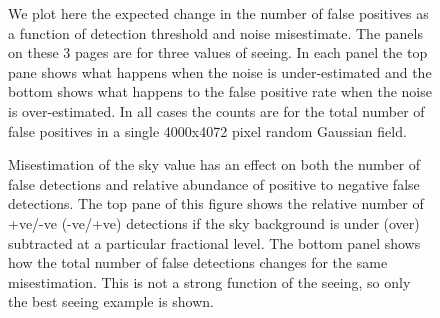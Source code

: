 \documentclass[prd, nofootinbib, floatfix, 11pt,tightenlines,times]{article}
\begin{document}
\begin{figure}
  \centering 
  \caption[]{ We plot here the expected change in the number of false positives
    as a function of detection threshold and noise misestimate.  The
    panels on these 3 pages are for three values of seeing.  In each panel the
    top pane shows what happens when the noise is under-estimated and
    the bottom shows what happens to the false positive rate when the
    noise is over-estimated.  In all cases the counts are for the
    total number of false positives in a single 4000x4072 pixel random
    Gaussian field.
    }
  \label{fig-fpthresh}
\end{figure}
\clearpage
\begin{figure}
  \ContinuedFloat 
  \centering 
  \caption[]{}
\end{figure} 
\clearpage
\begin{figure}
  \ContinuedFloat 
  \centering 
  \caption[]{}
\end{figure} 

\begin{figure}
\centering
{}
\caption{
Misestimation of the sky value has an effect on both the number of false detections and relative abundance of positive to negative false detections.
The top pane of this figure shows the relative number of +ve/-ve (-ve/+ve) detections if the sky background is under (over) subtracted at a particular fractional level.  The 
bottom panel shows how the total number of false detections changes for the same misestimation.  This is not a strong function of the seeing, so only the best
seeing example is shown.
}
\label{fig-skythresh}
\end{figure}
\end{document}
